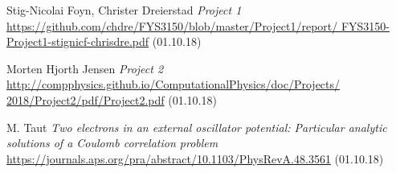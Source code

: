 \documentclass{emulateapj}
\begin{document}




\begin{acknowledgements}
\end{acknowledgements}


\begin{thebibliography}{9}

 Stig-Nicolai Foyn, Christer Dreierstad
\textit{Project 1}
\url{https://github.com/chdre/FYS3150/blob/master/Project1/report/
FYS3150-Project1-stignicf-chrisdre.pdf} (01.10.18)

 Morten Hjorth Jensen
\textit{Project 2}
\url{http://compphysics.github.io/ComputationalPhysics/doc/Projects/
2018/Project2/pdf/Project2.pdf} (01.10.18)

 M. Taut
\textit{Two electrons in an external oscillator potential: Particular analytic solutions of a Coulomb correlation problem}
\url{https://journals.aps.org/pra/abstract/10.1103/PhysRevA.48.3561} (01.10.18)

\end{thebibliography}
\end{document}
